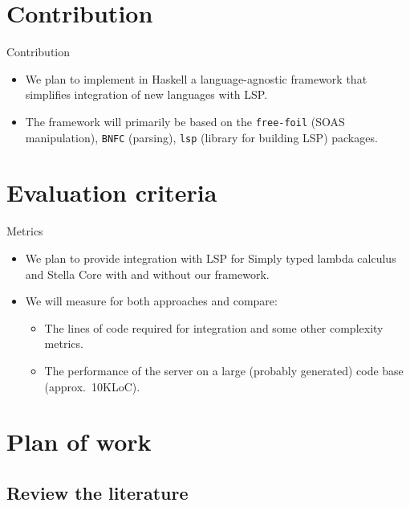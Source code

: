 \documentclass[serif, aspectratio=169]{beamer}
\begin{document}
\section{Contribution}

\begin{frame}{Contribution}
    \begin{itemize}
        [<+-| alert+>] %
        \item We plan to implement in Haskell a language-agnostic framework that simplifies integration of new languages with LSP.
        \item The framework will primarily be based on the \texttt{free-foil} \cite{hackage_free_foil} (SOAS manipulation), \texttt{BNFC} \cite{hackage_bnfc} (parsing), \texttt{lsp} \cite{hackage_lsp} (library for building LSP) packages.
    \end{itemize}
\end{frame}

\section{Evaluation criteria}

\begin{frame}{Metrics}
    \begin{itemize}
        [<+-| alert+>] %
        \item We plan to provide integration with LSP for Simply typed lambda calculus \cite{wiki_stlc} and Stella Core \cite{noauthor_fizrukstella_nodate} with and without our framework.
        \item We will measure for both approaches and compare:
              \begin{itemize}
                  \item The lines of code required for integration and some other complexity metrics.
                  \item The performance of the server on a large (probably generated) code base (approx.~10KLoC).
              \end{itemize}
    \end{itemize}
\end{frame}

\section{Plan of work}

\subsection{Review the literature}
\end{document}
